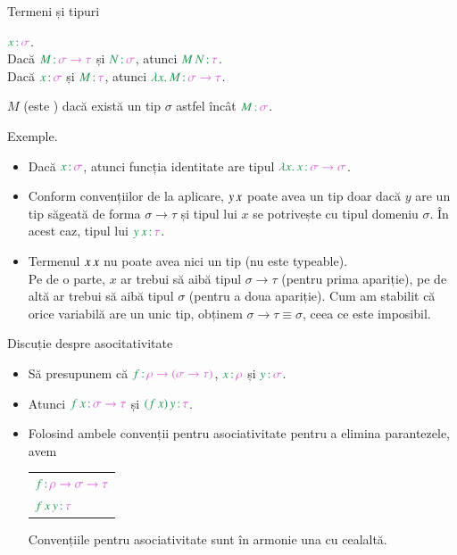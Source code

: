 \documentclass[xcolor=pdftex,romanian,colorlinks]{beamer}
\begin{document}
\begin{frame}{Termeni și tipuri}

 $\type{x}{\sigma}$. \\
 Dacă $\type{M}{\sigma \to \tau}$ și $\type{N}{\sigma}$, atunci $\type{\app{M}{N}}{\tau}$. \\
 Dacă $\type{x}{\sigma}$ și $\type{M}{\tau}$, atunci $\type{\abs{x}{M}}{\sigma \to \tau}$.

$M$  (este ) dacă există un tip $\sigma$ astfel încât $\type{M}{\sigma}$.

\pause
{\color{True} Exemple.}
\vspace{-.2cm}
\begin{itemize}
	\item Dacă {\color{True}$\type{x}{\sigma}$}, atunci funcția identitate are tipul {\color{True}$\type{\abs{x}{x}}{\sigma \to \sigma}$}.
	\smallskip
	\pause
	\item Conform convențiilor de la aplicare, {\color{True}$y\, x$} poate avea un tip doar dacă $y$ are un tip săgeată de forma $\sigma \to \tau$ și tipul lui $x$ se potrivește cu tipul domeniu $\sigma$. În acest caz, tipul lui {\color{True}$\type{\app{y}{x}}{\tau}$}.
	\smallskip
	\pause
	\item {\color{False}Termenul $x\, x$ nu poate avea nici un tip}  (nu este typeable). \\ 
	Pe de o parte, $x$ ar trebui să aibă tipul $\sigma \to \tau$ (pentru prima apariție), pe de altă ar trebui să aibă tipul $\sigma$ (pentru a doua apariție). Cum am stabilit că orice variabilă are un unic tip, obținem $\sigma \to \tau \equiv \sigma$, ceea ce este imposibil.
\end{itemize} 
\end{frame}


\begin{frame}{Discuție despre asocitativitate}

\begin{itemize}
	\item Să presupunem că {\color{True}$\type{f}{\rho \to (\sigma \to \tau)}$}, {\color{True}$\type{x}{\rho}$} și {\color{True}$\type{y}{\sigma}$}.
	\item Atunci {\color{True}$\type{\app{f}{x}}{\sigma \to \tau}$} și {\color{True}$\type{\app{(\app{f}{x})}{y}}{\tau}$}.
	\pause
	\item Folosind ambele convenții pentru asociativitate pentru a elimina parantezele, avem
	\begin{center}
	\begin{tabular}{l}
	{\color{True}$\type{f}{\rho \to \sigma \to \tau}$} \\
	{\color{True}$\type{\app{\app{f}{x}}{y}}{\tau}$}
	\end{tabular}
	\end{center}
	Convențiile pentru asociativitate sunt în armonie una cu cealaltă.
\end{itemize}
\end{frame}
\end{document}
